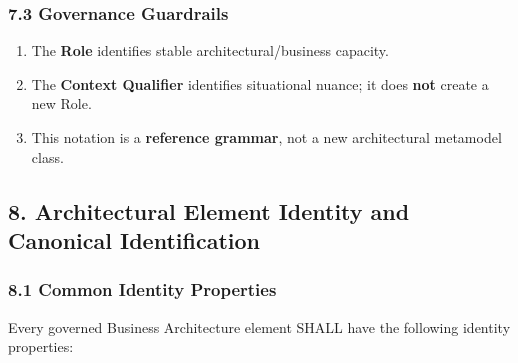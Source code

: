 \label{rad:metamodel:312}
\subsubsection*{7.3 Governance Guardrails}
\label{rad:metamodel:313}

\begin{enumerate}

\item
The \textbf{Role} identifies stable architectural/\allowbreak{}business capacity.



\item
The \textbf{Context Qualifier} identifies situational nuance; it does \textbf{not} create a new Role.



\item
This notation is a \textbf{reference grammar}, not a new architectural metamodel class.



\end{enumerate}
\label{rad:metamodel:317}

\par\smallskip
{}\label{rad:metamodel:319}
\subsection*{8. Architectural Element Identity and Canonical Identification}
\label{rad:metamodel:321}
\subsubsection*{8.1 Common Identity Properties}
\label{rad:metamodel:323}

Every governed Business Architecture element SHALL have the following identity properties:

